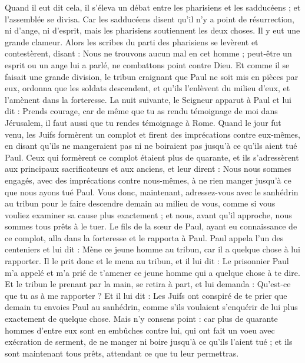 \begin{multicols}{2}
Quand il eut dit cela, il s'éleva un débat entre les pharisiens et les sadducéens ; et l'assemblée se divisa.
Car les sadducéens disent qu'il n'y a point de résurrection, ni d'ange, ni d'esprit, mais les pharisiens soutiennent les deux choses.
Il y eut une grande clameur. Alors les scribes du parti des pharisiens se levèrent et contestèrent, disant : Nous ne trouvons aucun mal en cet homme ; peut-être un esprit ou un ange lui a parlé, ne combattons point contre Dieu.
Et comme il se faisait une grande division, le tribun craignant que Paul ne soit mis en pièces par eux, ordonna que les soldats descendent, et qu'ils l'enlèvent du milieu d'eux, et l'amènent dans la forteresse.
La nuit suivante, le Seigneur apparut à Paul et lui dit : Prends courage, car de même que tu as rendu témoignage de moi dans Jérusalem, il faut aussi que tu rendes témoignage à Rome.
Quand le jour fut venu, les Juifs formèrent un complot et firent des imprécations contre eux-mêmes, en disant qu'ils ne mangeraient pas ni ne boiraient pas jusqu'à ce qu'ils aient tué Paul.
Ceux qui formèrent ce complot étaient plus de quarante,
et ils s'adressèrent aux principaux sacrificateurs et aux anciens, et leur dirent : Nous nous sommes engagés, avec des imprécations contre nous-mêmes, à ne rien manger jusqu'à ce que nous ayons tué Paul.
Vous donc, maintenant, adressez-vous avec le sanhédrin au tribun pour le faire descendre demain au milieu de vous, comme si vous vouliez examiner sa cause plus exactement ; et nous, avant qu'il approche, nous sommes tous prêts à le tuer.
Le fils de la sœur de Paul, ayant eu connaissance de ce complot, alla dans la forteresse et le rapporta à Paul.
Paul appela l'un des centeniers et lui dit : Mène ce jeune homme au tribun, car il a quelque chose à lui rapporter.
Il le prit donc et le mena au tribun, et il lui dit : Le prisonnier Paul m'a appelé et m'a prié de t'amener ce jeune homme qui a quelque chose à te dire.
Et le tribun le prenant par la main, se retira à part, et lui demanda : Qu'est-ce que tu as à me rapporter ?
Et il lui dit : Les Juifs ont conspiré de te prier que demain tu envoies Paul au sanhédrin, comme s'ils voulaient s'enquérir de lui plus exactement de quelque chose.
 Mais n'y consens point : car plus de quarante hommes d'entre eux sont en embûches contre lui, qui ont fait un voeu avec exécration de serment, de ne manger ni boire jusqu'à ce qu'ils l'aient tué ; et ils sont maintenant tous prêts, attendant ce que tu leur permettras.

\end{multicols}
